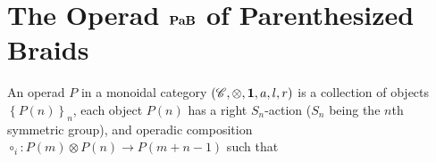 \section{\texorpdfstring{The Operad $\mathbf{PaB}$ of Parenthesized Braids}{The Operad PaB of Parenthesized Braids}}
\begin{definition}[operad]
	An operad $P$ in a monoidal category $(\mathscr{C},\otimes,\mathbf{1},a,l,r)$ is a collection of objects $\left\{ P(n) \right\}_n$, each object $P(n)$ has a right $S_n$-action ($S_n$ being the $n$th symmetric group), and operadic composition $\circ_i:P(m)\otimes P(n)\to P(m+n-1)$ such that
\end{definition}